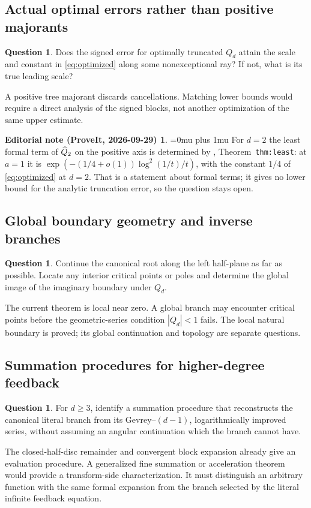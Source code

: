 \documentclass[11pt,a4paper]{article}
\numberwithin{equation}{section}
\theoremstyle{definition}\newtheorem{definition}[theorem]{Definition}
\newtheorem{question}[theorem]{Question}
\theoremstyle{remark}\newtheorem{remark}[theorem]{Remark}
\theoremstyle{definition}
\newtheorem*{ednoteinner}{Editorial note (ProveIt, 2026-09-29)}
\newenvironment{ednote}{\begin{ednoteinner}\sloppy\Urlmuskip=0mu plus 1mu\relax}{\end{ednoteinner}}
\begin{document}
\subsection{Actual optimal errors rather than positive majorants}
\begin{question}
Does the signed error for optimally truncated $Q_d$ attain the scale and
constant in \eqref{eq:optimized} along some nonexceptional ray? If not, what
is its true leading scale?
\end{question}
A positive tree majorant discards cancellations. Matching lower bounds
would require a direct analysis of the signed blocks, not another
optimization of the same upper estimate.
\begin{ednote}
For $d=2$ the least formal term of $\widehat Q_2$ on the positive axis is
determined by 
\cite{ed:scs}, Theorem~\texttt{thm:least}: at $a=1$ it is
$\exp(-(1/4+o(1))\log^2(1/t)/t)$, with the constant $1/4$ of
\eqref{eq:optimized} at $d=2$. That is a statement about formal terms; it
gives no lower bound for the analytic truncation error, so the question
stays open.
\end{ednote}

\subsection{Global boundary geometry and inverse branches}
\begin{question}
Continue the canonical root along the left half-plane as far as possible.
Locate any interior critical points or poles and determine the global image
of the imaginary boundary under $Q_d$.
\end{question}
The current theorem is local near zero. A global branch may encounter
critical points before the geometric-series condition $|Q_d|<1$ fails.
The local natural boundary is proved; its global continuation and topology
are separate questions.

\subsection{Summation procedures for higher-degree feedback}
\begin{question}
For $d\ge3$, identify a summation procedure that reconstructs the canonical
literal branch from its Gevrey--$(d-1)$, logarithmically improved series,
without assuming an angular continuation which the branch cannot have.
\end{question}
The closed-half-disc remainder and convergent block expansion already give
an evaluation procedure. A generalized fine summation or acceleration
theorem would provide a transform-side characterization. It must distinguish
an arbitrary function with the same formal expansion from the branch
selected by the literal infinite feedback equation.
\end{document}
